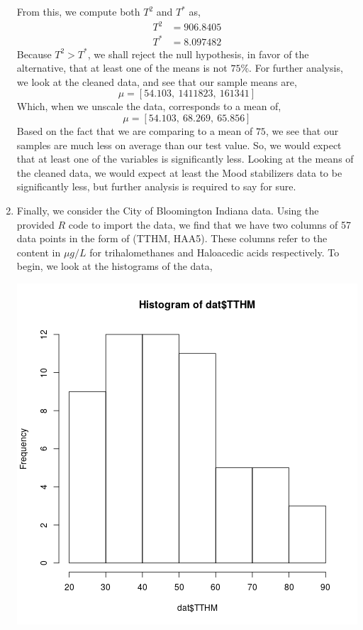 \documentclass[letterpaper,10pt]{article}
\begin{document}
\begin{enumerate}
From this, we compute both $T^2$ and $T^*$ as,
\begin{align*}
T^2 &= 906.8405\\
T^* &= 8.097482
\end{align*}
Because $T^2>T^*$, we shall reject the null hypothesis, in favor of the alternative, that at least one of the means is not $75\%$. For further analysis, we look at the cleaned data, and see that our sample means are,
\[\mu=[54.103,\ 1411823,\ 161341]\]
Which, when we unscale the data, corresponds to a mean of,
\[\mu=[54.103,\ 68.269,\ 65.856]\]
Based on the fact that we are comparing to a mean of $75$, we see that our samples are much less on average than our test value. So, we would expect that at least one of the variables is significantly less. Looking at the means of the cleaned data, we would expect at least the Mood stabilizers data to be significantly less, but further analysis is required to say for sure.
\item Finally, we consider the City of Bloomington Indiana data. Using the provided $R$ code to import the data, we find that we have two columns of 57 data points in the form of (TTHM, HAA5). These columns refer to the content in $\mu g/L$ for trihalomethanes and Haloacedic acids respectively. To begin, we look at the histograms of the data,
\begin{center}
\includegraphics[scale=.5]{thist.png}

\end{center}
\end{enumerate}
\end{document}
